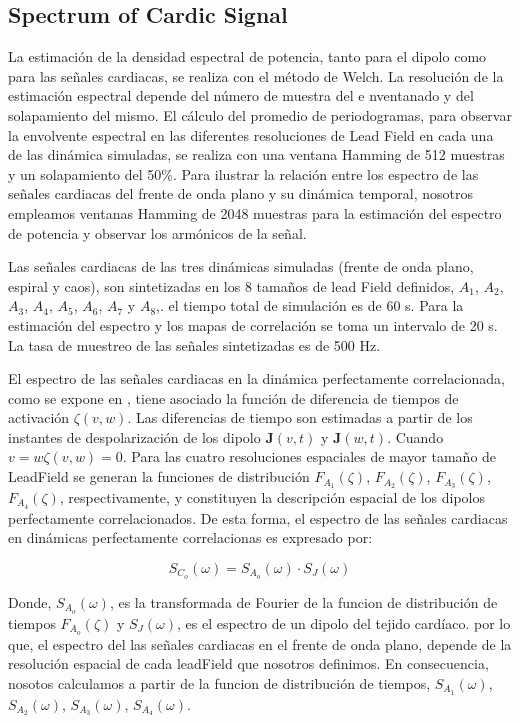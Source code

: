 \subsection{Spectrum of Cardic Signal}

La estimación de la densidad espectral de potencia,   tanto para el  dipolo como
para las señales cardiacas,  se realiza con el método de Welch.  La resolución
de la estimación espectral depende  del  número de muestra del  e nventanado y
del solapamiento del mismo. El cálculo del promedio de periodogramas,  para
observar la  envolvente espectral en las diferentes resoluciones  de Lead Field
en cada una de las dinámica simuladas, se realiza con una ventana  Hamming de
512  muestras y un solapamiento del 50\%. Para ilustrar la  relación entre los
espectro de las señales cardiacas del frente de onda plano y su dinámica
temporal,  nosotros empleamos ventanas Hamming de 2048 muestras para la
estimación del  espectro de potencia  y observar los armónicos de la señal.

Las señales cardiacas de las tres dinámicas simuladas (frente de onda plano,
espiral y caos), son sintetizadas en los 8 tamaños de lead Field definidos,
$A_1$, $A_2$, $A_3$, $A_4$, $A_5$, $A_6$, $A_7$ y $A_8$,. el tiempo total  de
simulación es de 60 s. Para la estimación del espectro  y  los mapas de
correlación  se toma un intervalo de 20 s. La  tasa de muestreo de las señales
sintetizadas es de 500 Hz.

El espectro de las señales cardiacas  en la dinámica perfectamente correlacionada, como se expone en \cite{RequenaSpectral1}, tiene asociado la función de diferencia de tiempos de activación ${\zeta}(v,w)$. Las diferencias de  tiempo son estimadas a partir de los instantes de  despolarización  de los  dipolo $\mathbf{J}(v,t)$ y $\mathbf{J}(w,t)$.  Cuando $v=w  { \zeta}(v,w)=0$. Para  las cuatro resoluciones espaciales de mayor tamaño de LeadField  se generan la funciones de distribución $F_{A_1}(\zeta)$, $F_{A_2}(\zeta)$, $F_{A_3}(\zeta)$, $F_{A_4}(\zeta)$, respectivamente, y constituyen la descripción espacial de los dipolos perfectamente correlacionados.  De esta forma, el espectro  de las señales cardiacas en dinámicas perfectamente correlacionas es expresado por:

\begin{equation}
S_{C_o}(\omega)=S_{A_o}(\omega) \cdot  S_{J}(\omega)
\end{equation}

Donde, $S_{A_o}(\omega)$, es la transformada de  Fourier de la funcion de distribución de  tiempos  $F_{A_o}(\zeta)$ y $S_{J}(\omega)$, es el espectro de un  dipolo del  tejido cardíaco. por lo que, el espectro del las  señales cardiacas en el frente de onda plano, depende de la resolución espacial de cada leadField que nosotros definimos. En consecuencia, nosotos calculamos a partir de la funcion de distribución de  tiempos, $S_{A_1}(\omega)$, $S_{A_2}(\omega)$, $S_{A_3}(\omega)$, $S_{A_4}(\omega)$.




